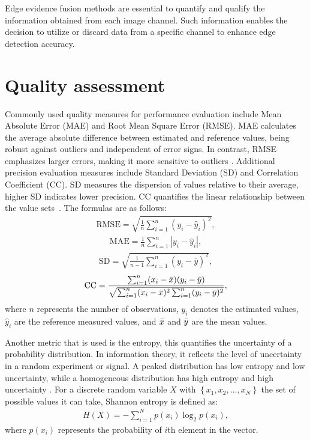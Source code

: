 \documentclass{article}
\begin{document}
Edge evidence fusion methods are essential to quantify and qualify the information obtained from each image channel. 
Such information enables the decision to utilize or discard data from a specific channel to enhance edge detection accuracy.

\section{Quality assessment}
\vspace{-0.2cm}
Commonly used quality measures for performance evaluation include Mean Absolute Error (MAE) and Root Mean Square Error (RMSE). MAE calculates the average absolute difference between estimated and reference values, being robust against outliers and independent of error signs. In contrast, RMSE emphasizes larger errors, making it more sensitive to outliers \cite{Ritter2013}. Additional precision evaluation measures include Standard Deviation (SD) and Correlation Coefficient (CC). SD measures the dispersion of values relative to their average, higher SD indicates lower precision. CC quantifies the linear relationship between the value sets~\cite{Vijayaraj}. The formulas are as follows:
\begin{align*}
	\text{RMSE} =\sqrt{\frac{1}{n}\sum_{i=1}^{n}\left(y_i-\hat{y}_i\right)^2},
\end{align*}
\vspace{-0.3cm}
\begin{align*}
	\text{MAE} =\frac{1}{n}\sum_{i=1}^{n}|y_i-\hat{y}_i|,
\end{align*}
\begin{align*}
	\text{SD} =\sqrt{\frac{1}{n-1}\sum_{i=1}^{n}\left(y_i-\bar{y}\right)^2},
\end{align*}
\begin{align*}
\text{CC}=  \frac{\sum_{i=1}^{n}(x_i-\Bar{x})(y_i-\Bar{y})}{\sqrt{\sum_{i=1}^{n}(x_i-\Bar{x})^2\sum_{i=1}^{n}(y_i-\Bar{y})^2}},
\end{align*}
where $n$ represents the number of observations, $y_i$ denotes the estimated values, $\hat{y}_i$ are the reference measured values, and  $\Bar{x}$ and $\Bar{y}$ are the mean values.

 Another metric that is used is the entropy, this quantifies the uncertainty of a probability distribution. In information theory, it reflects the level of uncertainty in a random experiment or signal. A peaked distribution has low entropy and low uncertainty, while a homogeneous distribution has high entropy and high uncertainty \cite{Mays2002}. For a discrete random variable $X$ with $\left\{x_1, x_2, \ldots, x_N\right\}$ the set of possible values it can take, Shannon entropy is defined as:
\begin{align}
	H(X)=-\sum_{i=1}^{N}p(x_i)\log_2p(x_i),
	\label{eq:H}
\end{align}
where $p(x_i)$ represents the probability of $i$th element in the vector.
\end{document}
